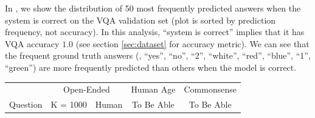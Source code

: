 In , we show the distribution of 50 most frequently predicted answers when the system is correct on the VQA validation set (plot is sorted by prediction frequency, not accuracy). In this analysis, ``system is correct'' implies that it has VQA accuracy $1.0$ (see section \ref{sec:dataset} for accuracy metric). We can see that the frequent ground truth answers (\eg, ``yes'', ``no'', ``2'', ``white'', ``red'', ``blue'', ``1'', ``green'') are more frequently predicted than others when the model is correct. 




\begin{table}[h] \scriptsize
\setlength{\tabcolsep}{2pt}
\begin{center}
\begin{tabular}{@{} l  c  c  c  c c c c@{}  }
\toprule
& \multicolumn{5}{c}{Open-Ended}   & Human Age & Commonsense\\

\cmidrule[0.9pt](l){2-6}

\multicolumn{1}{c}{Question} & \multicolumn{3}{c}{K = 1000} & \multicolumn{2}{c}{Human} & To Be Able & To Be Able\\
\cmidrule[0.5pt](lr){2-4}
\cmidrule[0.5pt](l){5-6}


\end{tabular}
\end{center}
\end{table}
